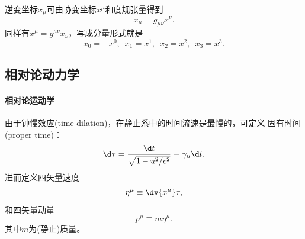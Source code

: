 \begin{corollary}
    逆变坐标$x_\mu$可由协变坐标$x^\mu$和度规张量得到
    \begin{equation}
        x_\mu=g_{\mu\nu}x^\nu.
    \end{equation}
    同样有$x^\mu=g^{\mu\nu}x_\nu$，写成分量形式就是
    \[
        x_0=-x^0,\enspace x_1=x^1,\enspace x_2=x^2,\enspace x_3=x^3.
    \]
\end{corollary}

\subsection{相对论动力学}

\paragraph{相对论运动学}

由于钟慢效应(time dilation)，在静止系中的时间流速是最慢的，可定义
固有时间(proper time)：
\[
    \d\tau=\frac{\d t}{\sqrt{1-u^2/c^2}}\equiv\gamma_u\d t.
\]
进而定义四矢量速度
\begin{equation}
    \eta^\mu\equiv\dv{x^\mu}\tau,
\end{equation}
和四矢量动量
\begin{equation}
    p^\mu\equiv m\eta^\mu.
\end{equation}
其中$m$为(静止)质量。

